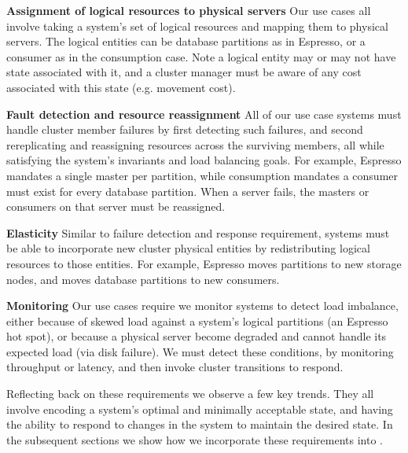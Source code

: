 \squishlist
\item \textbf{Assignment of logical resources to physical servers}
Our use cases all involve taking a system's set of logical resources and mapping
them to physical servers.  The logical entities can be database partitions as in
Espresso, or a consumer as in the \databus consumption case.  Note a logical
entity may or may not have state associated with it, and a cluster manager must
be aware of any cost associated with this state (e.g. movement cost).
\item \textbf{Fault detection and resource reassignment}
All of our use case systems must handle cluster member failures by first
detecting such failures, and second rereplicating and reassigning resources 
across the surviving members, all while satisfying the system's invariants and 
load balancing goals.  For example, Espresso mandates a single master per
partition, while \databus consumption mandates a consumer must exist for every
database partition.  When a server fails, the masters or consumers on that
server must be reassigned. 
\item \textbf{Elasticity} 
Similar to failure detection and response requirement, systems must be able to
incorporate new cluster physical entities by redistributing logical resources
to those entities.  For example, Espresso moves partitions to new storage nodes,
and \databus moves database partitions to new consumers.  
\item \textbf{Monitoring}
Our use cases require we monitor systems to detect load imbalance, either
because of skewed load against a system's logical partitions (\eg an Espresso
hot spot), or because a physical server become degraded and cannot
handle its expected load (\eg via disk failure).  We must detect these
conditions, \eg by monitoring throughput or latency, and then invoke cluster
transitions to respond.
\squishend
 
Reflecting back on these requirements we observe a few key trends.  They all
involve encoding a system's optimal and minimally acceptable state, and having the ability
to respond to changes in the system to maintain the desired state.  In the
subsequent sections we show how we incorporate these requirements into \helix. 


